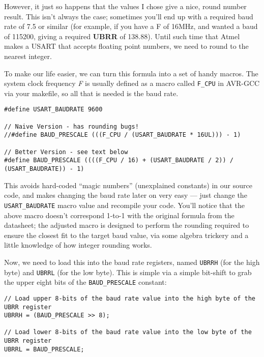 \documentclass[a4paper,oneside,notitlepage]{book}
\begin{document}
However, it just so happens that the values I chose give a nice, round number result. This isn't always the case; sometimes you'll end up with a required baud rate of 7.5 or similar (for example, if you have a F of 16MHz, and wanted a baud of 115200, giving a required \textbf{UBRR} of 138.88). Until such time that Atmel makes a USART that accepts floating point numbers, we need to round to the nearest integer.

To make our life easier, we can turn this formula into a set of handy macros. The system clock frequency \emph{F} is usually defined as a macro called \texttt{F\_CPU} in AVR-GCC via your makefile, so all that is needed is the baud rate.

\begin{center}
\begin{lstlisting}
#define USART_BAUDRATE 9600

// Naive Version - has rounding bugs!
//#define BAUD_PRESCALE (((F_CPU / (USART_BAUDRATE * 16UL))) - 1)

// Better Version - see text below
#define BAUD_PRESCALE ((((F_CPU / 16) + (USART_BAUDRATE / 2)) / (USART_BAUDRATE)) - 1)
\end{lstlisting}
\end{center}

This avoids hard-coded ``magic numbers'' (unexplained constants) in our source code, and makes changing the baud rate later on very easy --- just change the \texttt{USART\_BAUDRATE} macro value and recompile your code. You'll notice that the above macro doesn't correspond 1-to-1 with the original formula from the datasheet; the adjusted macro is designed to perform the rounding required to ensure the closest fit to the target baud value, via some algebra trickery and a little knowledge of how integer rounding works.

Now, we need to load this into the baud rate registers, named \texttt{UBRRH} (for the high byte) and \texttt{UBRRL} (for the low byte). This is simple via a simple bit-shift to grab the upper eight bits of the \texttt{BAUD\_PRESCALE} constant:

\begin{center}
\begin{lstlisting}
// Load upper 8-bits of the baud rate value into the high byte of the UBRR register
UBRRH = (BAUD_PRESCALE >> 8);

// Load lower 8-bits of the baud rate value into the low byte of the UBRR register
UBRRL = BAUD_PRESCALE;
\end{lstlisting}
\end{center}
\end{document}
